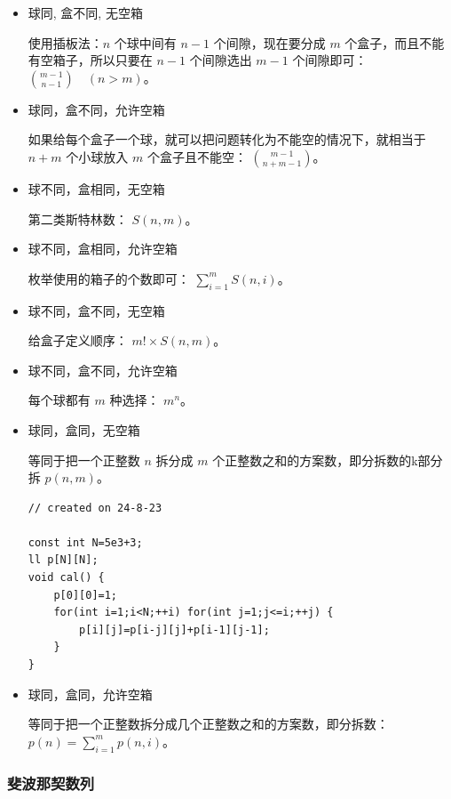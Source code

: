 \documentclass[a4paper,12pt]{article}
\begin{document}
\begin{itemize}
\item 
球同, 盒不同, 无空箱

使用插板法：\( n \) 个球中间有 \( n-1 \) 个间隙，现在要分成 \( m \) 个盒子，而且不能有空箱子，所以只要在 \( n-1 \) 个间隙选出 \( m-1 \) 个间隙即可：
\( \binom{m-1}{n-1} \quad (n > m) \)。

\item
球同，盒不同，允许空箱

如果给每个盒子一个球，就可以把问题转化为不能空的情况下，就相当于 \( n+m \) 个小球放入 \( m \) 个盒子且不能空：
\( \binom{m-1}{n+m-1}\)。

\item 
球不同，盒相同，无空箱

第二类斯特林数：
\( S(n,m) \)。

\item 
球不同，盒相同，允许空箱

枚举使用的箱子的个数即可：
\( \sum_{i=1}^m S(n,i)\)。

\item 
球不同，盒不同，无空箱

给盒子定义顺序：
\( m! \times S(n,m) \)。

\item 
球不同，盒不同，允许空箱

每个球都有 \( m \) 种选择：
\( m^n \)。

\item 
球同，盒同，无空箱

等同于把一个正整数 \( n \) 拆分成 \( m \) 个正整数之和的方案数，即分拆数的k部分拆 \( p(n,m) \)。

\begin{lstlisting}
// created on 24-8-23

const int N=5e3+3;
ll p[N][N];
void cal() {
    p[0][0]=1;
    for(int i=1;i<N;++i) for(int j=1;j<=i;++j) {
        p[i][j]=p[i-j][j]+p[i-1][j-1];
    }
}    
\end{lstlisting}
\item
球同，盒同，允许空箱

等同于把一个正整数拆分成几个正整数之和的方案数，即分拆数：
\( p(n) = \sum_{i=1}^m p(n,i) \)。

\end{itemize}

\subsubsection{斐波那契数列}
\end{document}
